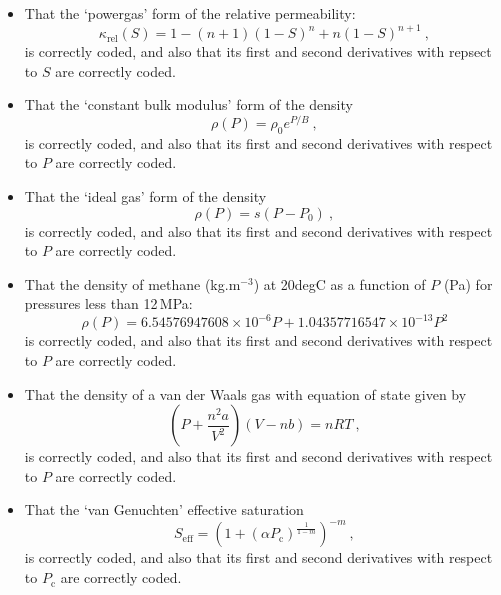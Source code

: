 \documentclass[]{scrreprt}
\begin{document}
\begin{itemize}
\item That the `powergas' form of the relative permeability:
\begin{equation}
\kappa_{\mathrm{rel}}(S) = 1 - (n+1)(1-S)^{n} + n(1-S)^{n+1} \ ,
\end{equation}
is correctly coded, and also that its first and second derivatives
with repsect to $S$ are correctly coded.


\item That the `constant bulk modulus' form of the density
\begin{equation}
\rho(P) = \rho_{0}e^{P/B} \ ,
\end{equation}
is correctly coded, and also that its first and second derivatives
with respect to $P$ are correctly coded.

\item That the `ideal gas' form of the density
\begin{equation}
\rho(P) = s(P-P_{\mathrm{0}}) \ ,
\end{equation}
is correctly coded, and also that its first and second derivatives
with respect to $P$ are correctly coded.

\item That the density of methane (kg.m$^{-3}$) at 20degC as a
  function of $P$ (Pa) for pressures less than 12\,MPa:
\begin{equation}
\rho(P) = 6.54576947608\times 10^{-6}P + 1.04357716547\times 10^{-13} P^{2}
\end{equation}
is correctly coded, and also that its first and second derivatives
with respect to $P$ are correctly coded.

\item That the density of a van der Waals gas with equation of state given by
\begin{equation}
\left( P + \frac{n^{2}a}{V^{2}} \right)(V- nb) = nRT \ ,
\end{equation}
is correctly coded, and also that its first and second derivatives
with respect to $P$ are correctly coded.

\item That the `van Genuchten' effective saturation
\begin{equation}
S_{\mathrm{eff}} = \left(1 + (\alpha
P_{\mathrm{c}})^{\frac{1}{1-m}}\right)^{-m} \ ,
\label{eqn.vg.cap}
\end{equation}
is correctly coded, and also that its first and second derivatives
with respect to $P_{\mathrm{c}}$ are correctly coded.


\end{itemize}
\end{document}
